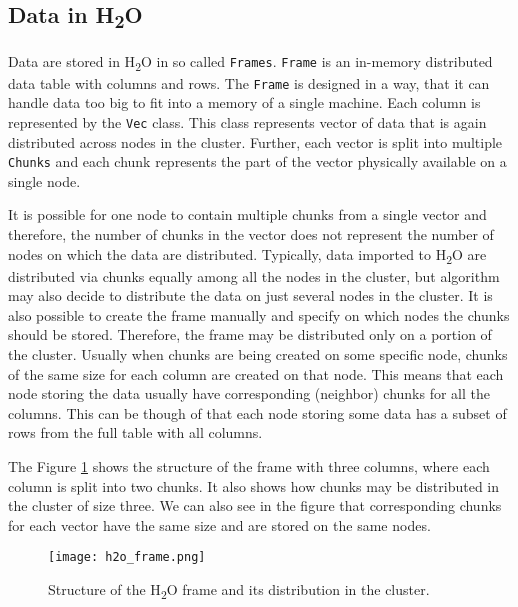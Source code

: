 \subsection{Data in H\textsubscript{2}O}
Data are stored in H\textsubscript{2}O in so called \texttt{Frames}. \texttt{Frame} is an in-memory distributed data table with columns and rows. The \texttt{Frame} is designed in a way, that it can handle data too big to fit into a memory of a single machine. Each column is represented by the \texttt{Vec} class. This class represents vector of data that is again distributed across nodes in the cluster. Further, each vector is split into multiple \texttt{Chunks} and each chunk represents the part of the vector physically available on a single node. 

It is possible for one node to contain multiple chunks from a single vector and therefore, the number of chunks in the vector does not represent the number of nodes on which the data are distributed. Typically, data imported to H\textsubscript{2}O are distributed via chunks equally among all the nodes in the cluster, but algorithm may also decide to distribute the data on just several nodes in the cluster. It is also possible to create the frame manually and specify on which nodes the chunks should be stored. Therefore, the frame may be distributed only on a portion of the cluster. Usually when chunks are being created on some specific node, chunks of the same size for each column are created on that node. This means that each node storing the data usually have corresponding (neighbor) chunks for all the columns. This can be though of that each node storing some data has a subset of rows from the full table with all columns.

The Figure \ref{fig:h2o_frame} shows the structure of the frame with three columns, where each column is split into two chunks. It also shows how chunks may be distributed in the cluster of size three. We can also see in the figure that corresponding chunks for each vector have the same size and are stored on the same nodes. 

	\begin{figure}
		\centering
		\texttt{[image: h2o\_frame.png]}
		\caption{Structure of the H\textsubscript{2}O frame and its distribution in the cluster.}
		\label{fig:h2o_frame}
	\end{figure}

